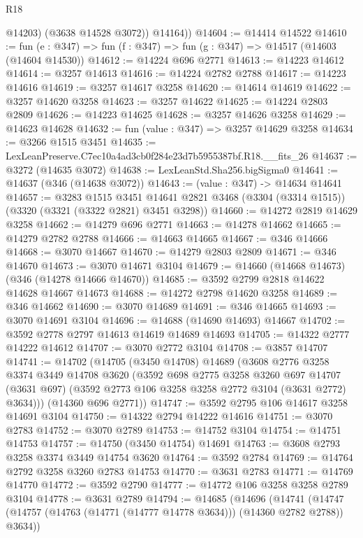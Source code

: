 \begin{lexlean}{R18}
\begin{coremodule}
            @14203)
          (@3638 @14528 @3072))
        @14164))
@14604 := @14414 @14522
@14610 := fun (e : @347) => fun (f : @347) => fun (g : @347) => @14517 (@14603 (@14604 @14530))
@14612 := @14224 @696 @2771
@14613 := @14223 @14612
@14614 := @3257 @14613
@14616 := @14224 @2782 @2788
@14617 := @14223 @14616
@14619 := @3257 @14617 @3258
@14620 := @14614 @14619
@14622 := @3257 @14620 @3258
@14623 := @3257 @14622
@14625 := @14224 @2803 @2809
@14626 := @14223 @14625
@14628 := @3257 @14626 @3258
@14629 := @14623 @14628
@14632 := fun (value : @347) => @3257 @14629 @3258
@14634 := @3266 @1515 @3451
@14635 := LexLeanPreserve.C7ec10a4ad3cb0f284e23d7b5955387bf.R18.__fits_26
@14637 := @3272 (@14635 @3072)
@14638 := LexLeanStd.Sha256.bigSigma0
@14641 := @14637 (@346 (@14638 @3072))
@14643 := (value : @347) -> @14634 @14641
@14657 := @3283
    @1515
    @3451
    @14641
    @2821
    @3468
    (@3304 (@3314 @1515))
    (@3320 (@3321 (@3322 @2821) @3451 @3298))
@14660 := @14272 @2819 @14629 @3258
@14662 := @14279 @696 @2771
@14663 := @14278 @14662
@14665 := @14279 @2782 @2788
@14666 := @14663 @14665
@14667 := @346 @14666
@14668 := @3070 @14667
@14670 := @14279 @2803 @2809
@14671 := @346 @14670
@14673 := @3070 @14671 @3104
@14679 := @14660 (@14668 @14673) (@346 (@14278 @14666 @14670))
@14685 := @3592 @2799 @2818 @14622 @14628 @14667 @14673
@14688 := @14272 @2798 @14620 @3258
@14689 := @346 @14662
@14690 := @3070 @14689
@14691 := @346 @14665
@14693 := @3070 @14691 @3104
@14696 := @14688 (@14690 @14693) @14667
@14702 := @3592 @2778 @2797 @14613 @14619 @14689 @14693
@14705 := @14322 @2777 @14222 @14612
@14707 := @3070 @2772 @3104
@14708 := @3857 @14707
@14741 := @14702
    (@14705
      (@3450 @14708)
      @14689
      (@3608
        @2776
        @3258
        @3374
        @3449
        @14708
        @3620
        (@3592
          @698
          @2775
          @3258
          @3260
          @697
          @14707
          (@3631 @697)
          (@3592 @2773 @106 @3258 @3258 @2772 @3104 (@3631 @2772) @3634)))
      (@14360 @696 @2771))
@14747 := @3592 @2795 @106 @14617 @3258 @14691 @3104
@14750 := @14322 @2794 @14222 @14616
@14751 := @3070 @2783
@14752 := @3070 @2789
@14753 := @14752 @3104
@14754 := @14751 @14753
@14757 := @14750 (@3450 @14754) @14691
@14763 := @3608 @2793 @3258 @3374 @3449 @14754 @3620
@14764 := @3592 @2784
@14769 := @14764 @2792 @3258 @3260 @2783 @14753
@14770 := @3631 @2783
@14771 := @14769 @14770
@14772 := @3592 @2790
@14777 := @14772 @106 @3258 @3258 @2789 @3104
@14778 := @3631 @2789
@14794 := @14685
    (@14696
      (@14741 (@14747 (@14757 (@14763 (@14771 (@14777 @14778 @3634))) (@14360 @2782 @2788)) @3634))

\end{coremodule}
\end{lexlean}
